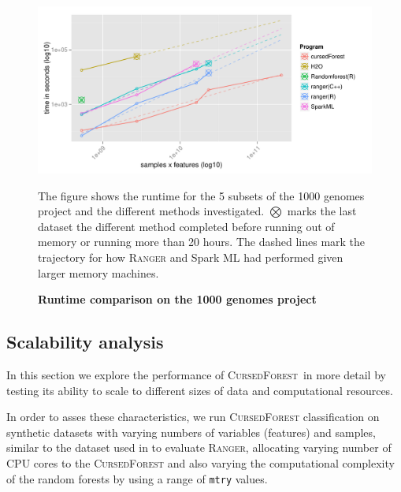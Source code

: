\documentclass[10pt,letterpaper]{article}
\newcommand{\cursedforest}{\textsc{CursedForest}\xspace}
\newcommand{\ranger}{\textsc{Ranger}\xspace}
\newcommand{\mtry}{\texttt{mtry}\xspace}
\begin{document}
\begin{figure}[tbhp]
  \begin{adjustwidth}{-1.00in}{0in}
    \caption{\textbf{Runtime comparison on the 1000 genomes project}}
    \label{figure:1000genomes}
    \includegraphics[totalheight=8cm]{./figs/1000genomesRuntime.pdf}
    \begin{flushleft}
      The figure shows the runtime for the 5 subsets of the 1000 genomes project and the different methods investigated.
      $\bigotimes$ marks the last dataset the different method completed before running out of memory or running more than
      20 hours. The dashed lines mark the trajectory for how \ranger and Spark ML had performed given larger memory machines.
    \end{flushleft}
  \end{adjustwidth}
\end{figure}



\subsection{Scalability analysis}
In this section we explore the performance of \cursedforest\ in more detail by testing its ability to scale to different sizes of data
and computational resources.

In order to asses these characteristics, we run \cursedforest classification on synthetic datasets with varying numbers
of variables (features) and samples, similar to the dataset used in \cite{Wright.and.Ziegle.2016} to evaluate
\ranger, allocating varying number of CPU cores to the \cursedforest and also varying the computational complexity
of the random forests by using a range of \mtry values.
\end{document}
